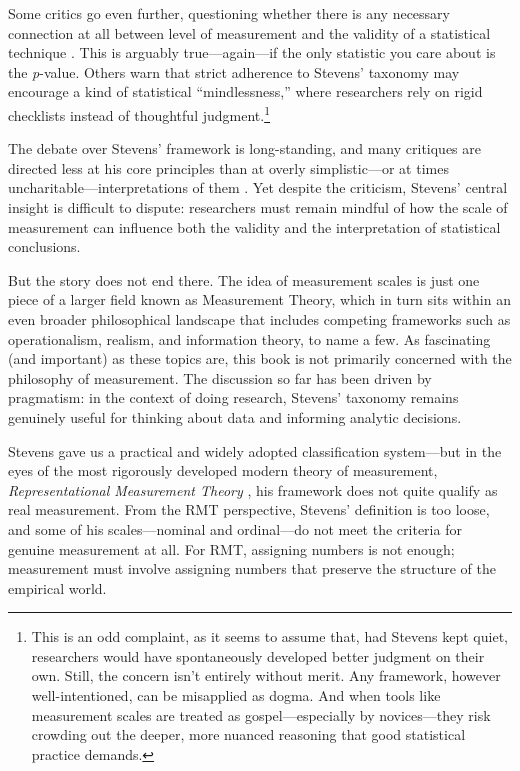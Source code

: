 Some critics go even further, questioning whether there is any necessary connection at all between level of measurement and the validity of a statistical technique \parencite{Gaito1980}. This is arguably true—again—if the only statistic you care about is the \textit{p}-value. Others warn that strict adherence to Stevens’ taxonomy may encourage a kind of statistical ``mindlessness,'' where researchers rely on rigid checklists instead of thoughtful judgment.\footnote{This is an odd complaint, as it seems to assume that, had Stevens kept quiet, researchers would have spontaneously developed better judgment on their own. Still, the concern isn’t entirely without merit. Any framework, however well-intentioned, can be misapplied as dogma. And when tools like measurement scales are treated as gospel—especially by novices—they risk crowding out the deeper, more nuanced reasoning that good statistical practice demands.}

The debate over Stevens’ framework is long-standing, and many critiques are directed less at his core principles than at overly simplistic—or at times uncharitable—interpretations of them \parencite[see][for a summary]{ZandScholten2009}. Yet despite the criticism, Stevens’ central insight is difficult to dispute: researchers must remain mindful of how the scale of measurement can influence both the validity and the interpretation of statistical conclusions.

But the story does not end there. The idea of measurement scales is just one piece of a larger field known as Measurement Theory, which in turn sits within an even broader philosophical landscape that includes competing frameworks such as operationalism, realism, and information theory, to name a few. As fascinating (and important) as these topics are, this book is not primarily concerned with the philosophy of measurement. The discussion so far has been driven by pragmatism: in the context of doing research, Stevens’ taxonomy remains genuinely useful for thinking about data and informing analytic decisions.

Stevens gave us a practical and widely adopted classification system—but in the eyes of the most rigorously developed modern theory of measurement, \textit{Representational Measurement Theory} \parencite[RMT;][]{Luce2001}, his framework does not quite qualify as real measurement. From the RMT perspective, Stevens’ definition is too loose, and some of his scales—nominal and ordinal—do not meet the criteria for genuine measurement at all. For RMT, assigning numbers is not enough; measurement must involve assigning numbers that preserve the structure of the empirical world.

